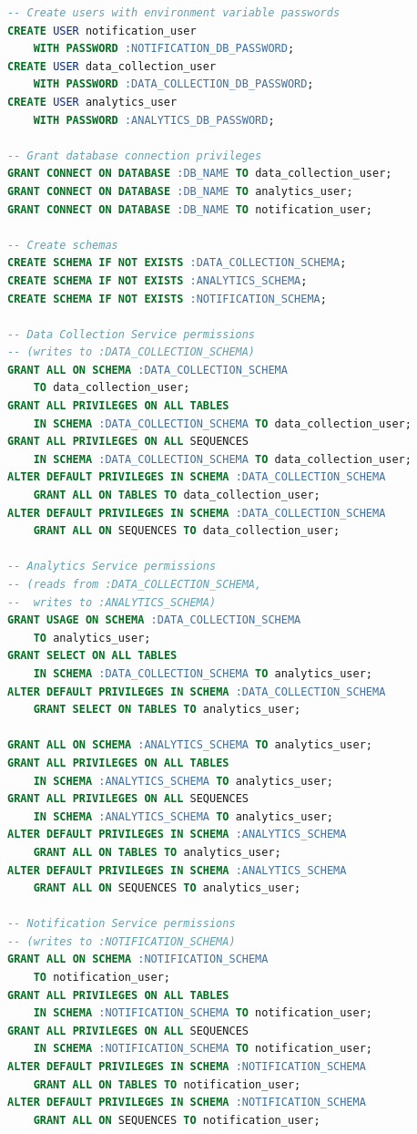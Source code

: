 \begin{lstlisting}[language=SQL, caption={Datenbank-Initialisierungsskript (init.sql)}, label={lst:init_sql}]
-- Create users with environment variable passwords
CREATE USER notification_user 
    WITH PASSWORD :NOTIFICATION_DB_PASSWORD;
CREATE USER data_collection_user 
    WITH PASSWORD :DATA_COLLECTION_DB_PASSWORD;
CREATE USER analytics_user 
    WITH PASSWORD :ANALYTICS_DB_PASSWORD;

-- Grant database connection privileges
GRANT CONNECT ON DATABASE :DB_NAME TO data_collection_user;
GRANT CONNECT ON DATABASE :DB_NAME TO analytics_user;
GRANT CONNECT ON DATABASE :DB_NAME TO notification_user;

-- Create schemas
CREATE SCHEMA IF NOT EXISTS :DATA_COLLECTION_SCHEMA;
CREATE SCHEMA IF NOT EXISTS :ANALYTICS_SCHEMA;
CREATE SCHEMA IF NOT EXISTS :NOTIFICATION_SCHEMA;

-- Data Collection Service permissions 
-- (writes to :DATA_COLLECTION_SCHEMA)
GRANT ALL ON SCHEMA :DATA_COLLECTION_SCHEMA 
    TO data_collection_user;
GRANT ALL PRIVILEGES ON ALL TABLES 
    IN SCHEMA :DATA_COLLECTION_SCHEMA TO data_collection_user;
GRANT ALL PRIVILEGES ON ALL SEQUENCES 
    IN SCHEMA :DATA_COLLECTION_SCHEMA TO data_collection_user;
ALTER DEFAULT PRIVILEGES IN SCHEMA :DATA_COLLECTION_SCHEMA 
    GRANT ALL ON TABLES TO data_collection_user;
ALTER DEFAULT PRIVILEGES IN SCHEMA :DATA_COLLECTION_SCHEMA 
    GRANT ALL ON SEQUENCES TO data_collection_user;

-- Analytics Service permissions 
-- (reads from :DATA_COLLECTION_SCHEMA, 
--  writes to :ANALYTICS_SCHEMA)
GRANT USAGE ON SCHEMA :DATA_COLLECTION_SCHEMA 
    TO analytics_user;
GRANT SELECT ON ALL TABLES 
    IN SCHEMA :DATA_COLLECTION_SCHEMA TO analytics_user;
ALTER DEFAULT PRIVILEGES IN SCHEMA :DATA_COLLECTION_SCHEMA 
    GRANT SELECT ON TABLES TO analytics_user;

GRANT ALL ON SCHEMA :ANALYTICS_SCHEMA TO analytics_user;
GRANT ALL PRIVILEGES ON ALL TABLES 
    IN SCHEMA :ANALYTICS_SCHEMA TO analytics_user;
GRANT ALL PRIVILEGES ON ALL SEQUENCES 
    IN SCHEMA :ANALYTICS_SCHEMA TO analytics_user;
ALTER DEFAULT PRIVILEGES IN SCHEMA :ANALYTICS_SCHEMA 
    GRANT ALL ON TABLES TO analytics_user;
ALTER DEFAULT PRIVILEGES IN SCHEMA :ANALYTICS_SCHEMA 
    GRANT ALL ON SEQUENCES TO analytics_user;

-- Notification Service permissions 
-- (writes to :NOTIFICATION_SCHEMA)
GRANT ALL ON SCHEMA :NOTIFICATION_SCHEMA 
    TO notification_user;
GRANT ALL PRIVILEGES ON ALL TABLES 
    IN SCHEMA :NOTIFICATION_SCHEMA TO notification_user;
GRANT ALL PRIVILEGES ON ALL SEQUENCES 
    IN SCHEMA :NOTIFICATION_SCHEMA TO notification_user;
ALTER DEFAULT PRIVILEGES IN SCHEMA :NOTIFICATION_SCHEMA 
    GRANT ALL ON TABLES TO notification_user;
ALTER DEFAULT PRIVILEGES IN SCHEMA :NOTIFICATION_SCHEMA 
    GRANT ALL ON SEQUENCES TO notification_user;


\end{lstlisting}

